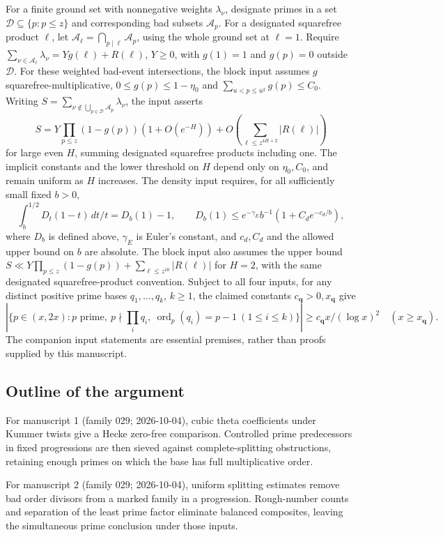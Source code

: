 \documentclass[11pt]{article}
\begin{document}
For a finite ground set with nonnegative weights $\lambda_\nu$, designate primes in a set $\mathcal D\subseteq\{p:p\le z\}$ and corresponding bad subsets $\mathcal A_p$. For a designated squarefree product $\ell$, let $\mathcal A_\ell=\bigcap_{p\mid\ell}\mathcal A_p$, using the whole ground set at $\ell=1$. Require $\sum_{\nu\in\mathcal A_\ell}\lambda_\nu=Yg(\ell)+R(\ell)$, $Y\ge0$, with $g(1)=1$ and $g(p)=0$ outside $\mathcal D$. For these weighted bad-event intersections, the block input assumes $g$ squarefree-multiplicative, $0\le g(p)\le1-\eta_0$ and $\sum_{u<p\le u^2}g(p)\le C_0$. Writing $S=\sum_{\nu\notin\bigcup_{p\in\mathcal D}\mathcal A_p}\lambda_\nu$, the input asserts
\[
 S=Y\prod_{p\le z}(1-g(p))(1+O(e^{-H}))
 +O(\sum_{\ell\le z^{4H+2}}|R(\ell)|)
\]
for large even $H$, summing designated squarefree products including one. The implicit constants and the lower threshold on $H$ depend only on $\eta_0,C_0$, and remain uniform as $H$ increases. The density input requires, for all sufficiently small fixed $b>0$,
\[
 \int_b^{1/2}D_t(1-t)\,dt/t=D_b(1)-1,
 \qquad D_b(1)\le e^{-\gamma_E}b^{-1}(1+C_de^{-c_d/b}),
\]
where $D_b$ is defined above, $\gamma_E$ is Euler's constant, and $c_d,C_d$ and the allowed upper bound on $b$ are absolute. The block input also assumes the upper bound $S\ll Y\prod_{p\le z}(1-g(p))+\sum_{\ell\le z^{10}}|R(\ell)|$ for $H=2$, with the same designated squarefree-product convention. Subject to all four inputs, for any distinct positive prime bases $q_1,\ldots,q_k$, $k\ge1$, the claimed constants $c_{\mathbf q}>0,x_{\mathbf q}$ give
\[
 |\{p\in(x,2x):p\text{ prime},\ p\nmid\prod_iq_i,\ \operatorname{ord}_p(q_i)=p-1\ (1\le i\le k)\}|
 \ge c_{\mathbf q}x/(\log x)^2\quad(x\ge x_{\mathbf q}).
\]
The companion input statements are essential premises, rather than proofs supplied by this manuscript.

\subsection{Outline of the argument}
For manuscript 1 (family 029; 2026-10-04), cubic theta coefficients under Kummer twists give a Hecke zero-free comparison. Controlled prime predecessors in fixed progressions are then sieved against complete-splitting obstructions, retaining enough primes on which the base has full multiplicative order.

For manuscript 2 (family 029; 2026-10-04), uniform splitting estimates remove bad order divisors from a marked family in a progression. Rough-number counts and separation of the least prime factor eliminate balanced composites, leaving the simultaneous prime conclusion under those inputs.
\end{document}
